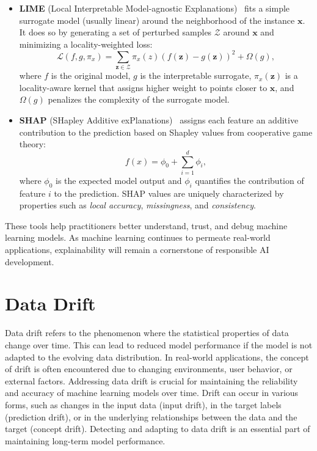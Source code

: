 \begin{itemize}
    \item \textbf{LIME} (Local Interpretable Model-agnostic Explanations)~\cite{lime} fits a
          simple surrogate model (usually linear) around the neighborhood of the instance $\mathbf{x}$. It does so by generating a set of perturbed samples $\mathcal{Z}$ around $\mathbf{x}$ and minimizing a locality-weighted loss:
          \begin{equation}
              \mathcal{L}(f, g, \pi_x) = \sum_{\mathbf{z} \in \mathcal{Z}} \pi_x(z) (f(\mathbf{z}) - g(\mathbf{z}))^2 + \Omega(g),
          \end{equation}
          where $f$ is the original model, $g$ is the interpretable surrogate, $\pi_x(\mathbf{z})$
          is a locality-aware kernel that assigns higher weight to points closer to $\mathbf{x}$, and $\Omega(g)$ penalizes the complexity of the surrogate model.

    \item \textbf{SHAP} (SHapley Additive exPlanations)~\cite{shap} assigns each feature an
          additive contribution to the prediction based on Shapley values from cooperative game theory:
          \begin{equation}
              f(x) = \phi_0 + \sum_{i=1}^{d} \phi_i,
          \end{equation}
          where $\phi_0$ is the expected model output and $\phi_i$ quantifies the
          contribution of feature $i$ to the prediction. SHAP values are uniquely
          characterized by properties such as \textit{local accuracy},
          \textit{missingness}, and \textit{consistency}.
\end{itemize}

These tools help practitioners better understand, trust, and debug machine
learning models. As machine learning continues to permeate real-world
applications, explainability will remain a cornerstone of responsible AI
development.

\section{Data Drift}\label{sec:data_drift}
Data drift refers to the phenomenon where the statistical properties of data
change over time. This can lead to reduced model performance if the model is
not adapted to the evolving data distribution. In real-world applications, the
concept of drift is often encountered due to changing environments, user
behavior, or external factors. Addressing data drift is crucial for maintaining
the reliability and accuracy of machine learning models over time. Drift can
occur in various forms, such as changes in the input data (input drift), in the
target labels (prediction drift), or in the underlying relationships between
the data and the target (concept drift). Detecting and adapting to data drift
is an essential part of maintaining long-term model performance.

